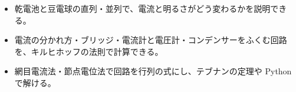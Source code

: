 \newcommand\sxfdot[1]{\fill[bkInk] #1 circle (0.85);}
\newcommand\sxfthree[5]{%
  \draw[sxf w] (0,0) rectangle (72,36) (36,0) -- (36,36);
  \path (0,11) pic {sxf batt} (72,11) pic {sxf batt} (0,25) pic {sxf resv} (36,18) pic {sxf resv} (72,25) pic {sxf resv};
  \sxfdot{(36,36)}\sxfdot{(36,0)}
  \node[sxf lab, anchor=east] at (-5,11) {#1};
  \node[sxf lab, anchor=east] at (-2.6,25) {#2};
  \node[sxf lab, anchor=west] at (38.6,18) {#3};
  \node[sxf lab, anchor=west] at (74.6,25) {#4};
  \node[sxf lab, anchor=west] at (77,11) {#5};
  \node[sxf lab, anchor=south west] at (4.6,12.3) {＋};
  \node[sxf lab, anchor=south east] at (67.4,12.3) {＋};}
\makeatother


\begin{goal}
\begin{itemize}[label={\color{bkTheme}●}, leftmargin=1.6\zw, itemsep=0pt, topsep=1pt]
\item {}\enspace 乾電池と豆電球の直列・並列で、電流と明るさがどう変わるかを説明できる。
\item {}\enspace 電流の分かれ方・ブリッジ・電流計と電圧計・コンデンサーをふくむ回路を、キルヒホッフの法則で計算できる。
\item {}\enspace 網目電流法・節点電位法で回路を行列の式にし、テブナンの定理や Python で解ける。
\end{itemize}
\end{goal}


